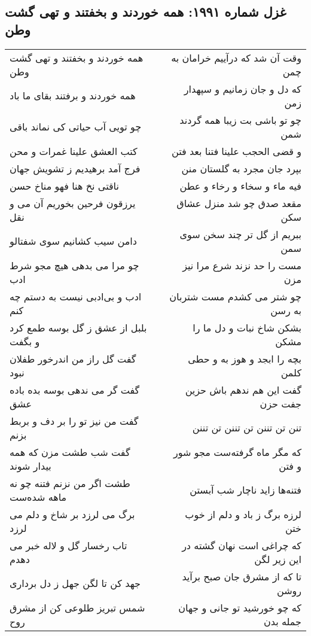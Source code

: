 \begin{center}
\section*{غزل شماره ۱۹۹۱: همه خوردند و بخفتند و تهی گشت وطن}
\label{sec:1991}
\begin{longtable}{l p{0.5cm} r}
همه خوردند و بخفتند و تهی گشت وطن
&&
وقت آن شد که درآییم خرامان به چمن
\\
همه خوردند و برفتند بقای ما باد
&&
که دل و جان زمانیم و سپهدار زمن
\\
چو تویی آب حیاتی کی نماند باقی
&&
چو تو باشی بت زیبا همه گردند شمن
\\
کتب العشق علینا غمرات و محن
&&
و قضی الحجب علینا فتنا بعد فتن
\\
فرج آمد برهیدیم ز تشویش جهان
&&
بپرد جان مجرد به گلستان منن
\\
ناقتی نخ هنا فهو مناخ حسن
&&
فیه ماء و سخاء و رخاء و عطن
\\
یرزقون فرحین بخوریم آن می و نقل
&&
مقعد صدق چو شد منزل عشاق سکن
\\
دامن سیب کشانیم سوی شفتالو
&&
ببریم از گل تر چند سخن سوی سمن
\\
چو مرا می بدهی هیچ مجو شرط ادب
&&
مست را حد نزند شرع مرا نیز مزن
\\
ادب و بی‌ادبی نیست به دستم چه کنم
&&
چو شتر می کشدم مست شتربان به رسن
\\
بلبل از عشق ز گل بوسه طمع کرد و بگفت
&&
بشکن شاخ نبات و دل ما را مشکن
\\
گفت گل راز من اندرخور طفلان نبود
&&
بچه را ابجد و هوز به و حطی کلمن
\\
گفت گر می ندهی بوسه بده باده عشق
&&
گفت این هم ندهم باش حزین جفت حزن
\\
گفت من نیز تو را بر دف و بربط بزنم
&&
تنن تن تننن تن تننن تن تننن
\\
گفت شب طشت مزن که همه بیدار شوند
&&
که مگر ماه گرفته‌ست مجو شور و فتن
\\
طشت اگر من نزنم فتنه چو نه ماهه شده‌ست
&&
فتنه‌ها زاید ناچار شب آبستن
\\
برگ می لرزد بر شاخ و دلم می لرزد
&&
لرزه برگ ز باد و دلم از خوب ختن
\\
تاب رخسار گل و لاله خبر می دهدم
&&
که چراغی است نهان گشته در این زیر لگن
\\
جهد کن تا لگن جهل ز دل برداری
&&
تا که از مشرق جان صبح برآید روشن
\\
شمس تبریز طلوعی کن از مشرق روح
&&
که چو خورشید تو جانی و جهان جمله بدن
\\
\end{longtable}
\end{center}
